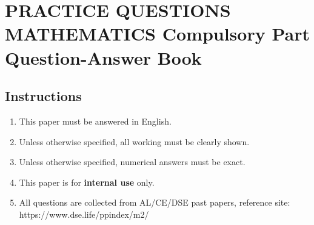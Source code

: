 \documentclass[11pt]{article}
\begin{document}
    \thispagestyle{plain}

    \centering 

    \section*{PRACTICE QUESTIONS\\MATHEMATICS Compulsory Part\\Question-Answer Book}

    \raggedright

    \subsection*{Instructions}

    \begin{enumerate}
        \item This paper must be answered in English.
        \item Unless otherwise specified, all working must be clearly shown.
        \item Unless otherwise specified, numerical answers must be exact.
        \item This paper is for \textbf{internal use} only.
        \item All questions are collected from AL/CE/DSE past papers, reference site: https://www.dse.life/ppindex/m2/
    \end{enumerate}

    \newpage
\end{document}

